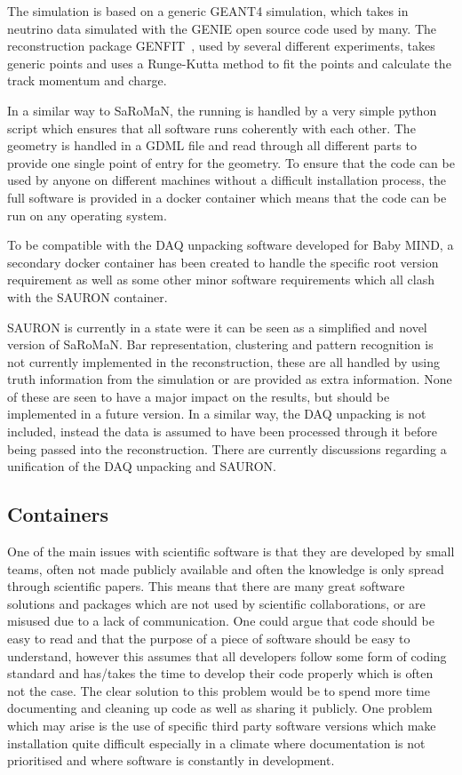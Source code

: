 The simulation is based on a generic GEANT4 simulation, which takes in neutrino data simulated with the GENIE open source code used by many. The reconstruction package  GENFIT~\cite{81Genfit}, used by several different experiments, takes generic points and uses a Runge-Kutta method to fit the points and calculate the track momentum and charge.

In a similar way to SaRoMaN, the running is handled by a very simple python script which ensures that all software runs coherently with each other. The geometry is handled in a GDML file and read through all different parts to provide one single point of entry for the geometry. To ensure that the code can be used by anyone on different machines without a difficult installation process, the full software is provided in a docker container which means that the code can be run on any operating system. 

To be compatible with the DAQ unpacking software developed for Baby MIND, a secondary docker container has been created to handle the specific root version requirement as well as some other minor software requirements which all clash with the SAURON container.

SAURON is currently in a state were it can be seen as a simplified and novel version of SaRoMaN. Bar representation, clustering and pattern recognition is not currently implemented in the reconstruction, these are all handled by using truth information from the simulation or are provided as extra information. None of these are seen to have a major impact on the results, but should be implemented in a future version. In a similar way, the DAQ unpacking is not included, instead the data is assumed to have been processed through it before being passed into the reconstruction. There are currently discussions regarding a unification of the DAQ unpacking and SAURON.

\subsection{Containers}
One of the main issues with scientific software is that they are developed by small teams, often not made publicly available and often the knowledge is only spread through scientific papers. This means that there are many great software solutions and packages which are not used by scientific collaborations, or are misused due to a lack of communication. One could argue that code should be easy to read and that the purpose of a piece of software should be easy to understand, however this assumes that all developers follow some form of coding standard and has/takes the time to develop their code properly which is often not the case. The clear solution to this problem would be to spend more time documenting and cleaning up code as well as sharing it publicly. One problem which may arise is the use of specific third party software versions which make installation quite difficult especially in a climate where documentation is not prioritised and where software is constantly in development.

